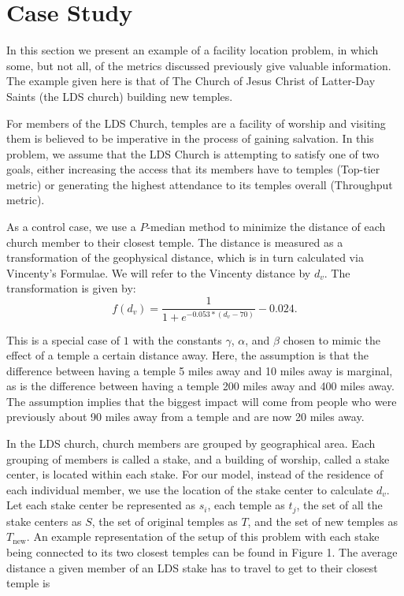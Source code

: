 \documentclass[twoside,twocolumn]{article}
\begin{document}
\section{Case Study}

In this section we present an example of a facility location problem, in which some, but not all, of the metrics discussed previously give valuable information. 
The example given here is that of The Church of Jesus Christ of Latter-Day Saints (the LDS church) building new temples.


For members of the LDS Church, temples are a facility of worship and visiting them is believed to be imperative in the process of gaining salvation.
In this problem, we assume that the LDS Church is attempting to satisfy one of two goals, either increasing the access that its members have to temples (Top-tier metric) or generating the highest attendance to its temples overall (Throughput metric).

As a control case, we use a $P$-median method to minimize the distance of each church member to their closest temple.
The distance is measured as a transformation of the geophysical distance, which is in turn calculated via Vincenty's Formulae. %
We will refer to the Vincenty distance by $d_{v}$. %
The transformation is given by:
\begin{equation}
f(d_{v}) = \frac{1}{1+e^{-0.053*(d_{v} - 70)}} - 0.024.
\end{equation}

This is a special case of \(1\) with the constants $\gamma$, $\alpha$, and $\beta$ chosen to mimic the effect of a temple a certain distance away.
Here, the assumption is that the difference between having a temple 5 miles away and 10 miles away is marginal, as is the difference between having a temple 200 miles away and 400 miles away.
The assumption implies that the biggest impact will come from people who were previously about 90 miles away from a temple and are now 20 miles away.

In the LDS church, church members are grouped by geographical area.
Each grouping of members is called a stake, and a building of worship, called a stake center, is located within each stake.
For our model, instead of the residence of each individual member, we use the location of the stake center to calculate $d_{v}$.
Let each stake center be represented as $s_i$, each temple as $t_j$, the set of all the stake centers as $S$, the set of original temples as $T$, and the set of new temples as $T_{\text{new}}$. %
An example representation of the setup of this problem with each stake being connected to its two closest temples can be found in Figure 1.
The average distance a given member of an LDS stake has to travel to get to their closest temple is
\end{document}
